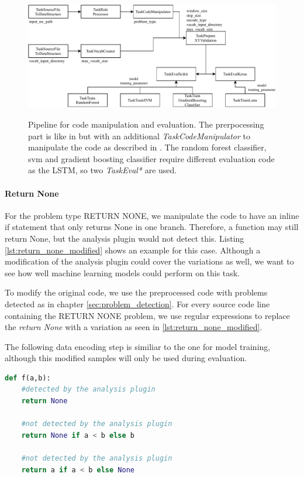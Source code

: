 \begin{figure}
    \includegraphics[width=1\textwidth]{img/ML/Pipeline_RQ3.pdf}
    \label{fig:pipeline_RQ3}
    \caption[Pipeline for code manipulation and evaluation.]{Pipeline for code manipulation and evaluation. The prerpocessing part is like in  but with an additional \textit{TaskCodeManipulator} to manipulate the code as described in . The random forest classifier, svm and gradient boosting classifier require different evaluation code as the LSTM, so two \textit{TaskEval*} are used.  }
\end{figure}


\paragraph{Return None}\label{par:manipulation_return_none}
For the problem type RETURN NONE, we manipulate the code to have an inline if statement that only returns None in one branch. Therefore, a function may still return None, but the analysis plugin would not detect this. Listing \ref{lst:return_none_modified} shows an example for this case. Although a modification of the analysis plugin could cover the variations as well, we want to see how well machine learning models could perform on this task.

To modify the original code, we use the preprocessed code with problems detected as in chapter \ref{sec:problem_detection}. For every source code line containing the RETURN NONE problem, we use regular expressions to replace the \textit{return None} with a variation as seen in \ref{lst:return_none_modified}. 

The following data encoding step is similiar to the one for model training, although this modified samples will only be used during evaluation.

\begin{minipage}[c]{\linewidth}
\begin{lstlisting}[language=Python, label=lst:return_none_modified, caption={Samples for returning None. The first return would be flagged by the analysis plugin, the second and third return are modified variations that would be ignored by the analysis plugin. The performance of the machine learning models on detecting the latter will be evaluated.}]
def f(a,b):
    #detected by the analysis plugin
    return None 

    #not detected by the analysis plugin
    return None if a < b else b 

    #not detected by the analysis plugin
    return a if a < b else None \end{lstlisting}
\end{minipage}
